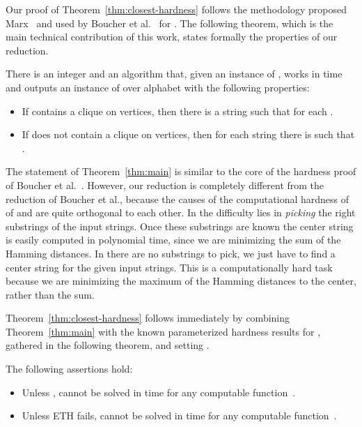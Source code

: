 Our proof of Theorem~\ref{thm:closest-hardness} follows the methodology proposed Marx~\cite{Marx08-survey} and used by Boucher et al.~\cite{Boucher15} for \cPattern. 
The following theorem, which is the main technical contribution of this work, states formally the properties of our reduction.

\begin{theorem}\label{thm:main}
There is an integer  and an algorithm that, given an instance  of \clique, works in time  and outputs an instance  of \clString over alphabet  with the following properties:
\begin{itemize}
\item If  contains a clique on  vertices, then there is a string  such that  for each .
\item If  does not contain a clique on  vertices, then for each string  there is  such that . 
\end{itemize}
\end{theorem}

The statement of Theorem~\ref{thm:main} is similar to the core of the hardness proof of Boucher et al.~\cite{Boucher15}. However, our reduction is completely different from the reduction of Boucher et al., because the causes of the computational hardness of of \clString and \cPattern are quite orthogonal to each other. In \cPattern the difficulty lies in {\em picking} the right substrings of the input strings. Once these substrings are known the center string is easily computed in polynomial time, since we are minimizing the sum of the Hamming distances. In \clString there are no substrings to pick, we just have to find a center string for the given input strings. This is a computationally hard task because we are minimizing the maximum of the Hamming distances to the center, rather than the sum. 






Theorem~\ref{thm:closest-hardness} follows immediately by combining Theorem~\ref{thm:main} with the known parameterized hardness results for \clique, gathered in the following theorem, and setting .

\begin{theorem}\label{thm:clique-hardness}
The following assertions hold:
\begin{itemize}
\item Unless , \clique cannot be solved in time  for any computable function~.
\item Unless ETH fails, \clique cannot be solved in time  for any computable function~.
\end{itemize}
\end{theorem}

